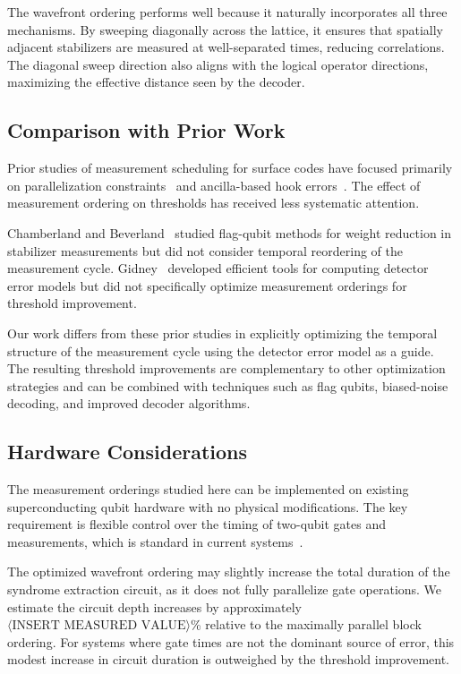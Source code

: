 \documentclass[
    reprint,
    aps,
    prx,
    superscriptaddress,
    longbibliography
]{revtex4-2}
\begin{document}
The wavefront ordering performs well because it naturally incorporates all three mechanisms. By sweeping diagonally across the lattice, it ensures that spatially adjacent stabilizers are measured at well-separated times, reducing correlations. The diagonal sweep direction also aligns with the logical operator directions, maximizing the effective distance seen by the decoder.

\subsection{Comparison with Prior Work}
\label{subsec:comparison}

Prior studies of measurement scheduling for surface codes have focused primarily on parallelization constraints~\cite{Fowler2012Surface, Tomita2014LowDistance} and ancilla-based hook errors~\cite{Fowler2012Surface}. The effect of measurement ordering on thresholds has received less systematic attention.

Chamberland and Beverland~\cite{Chamberland2018Flag} studied flag-qubit methods for weight reduction in stabilizer measurements but did not consider temporal reordering of the measurement cycle. Gidney~\cite{Gidney2021Stim} developed efficient tools for computing detector error models but did not specifically optimize measurement orderings for threshold improvement.

Our work differs from these prior studies in explicitly optimizing the temporal structure of the measurement cycle using the detector error model as a guide. The resulting threshold improvements are complementary to other optimization strategies and can be combined with techniques such as flag qubits, biased-noise decoding, and improved decoder algorithms.

\subsection{Hardware Considerations}
\label{subsec:hardware}

The measurement orderings studied here can be implemented on existing superconducting qubit hardware with no physical modifications. The key requirement is flexible control over the timing of two-qubit gates and measurements, which is standard in current systems~\cite{Google2023Suppressing, IBM2024Quantum}.

The optimized wavefront ordering may slightly increase the total duration of the syndrome extraction circuit, as it does not fully parallelize gate operations. We estimate the circuit depth increases by approximately $\langle\text{INSERT MEASURED VALUE}\rangle$\% relative to the maximally parallel block ordering. For systems where gate times are not the dominant source of error, this modest increase in circuit duration is outweighed by the threshold improvement.
\end{document}
